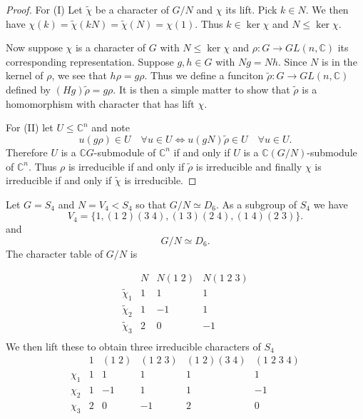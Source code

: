 \documentclass[11pt, notitlepage]{article}
\numberwithin{equation}{section}
\theoremstyle{plain}
\theoremstyle{definition}
\newenvironment{example}
	{\pushQED{\qed}\renewcommand{\qedsymbol}{$\blacktriangleleft$}\examplex}
	{\popQED\endexamplex}
\begin{document}
\begin{proof}
	For (I) Let $\tilde\chi$ be a character of $G/N$ and $\chi$ its lift. Pick $k\in N$. We then have $\chi(k) = \tilde\chi(kN) = \tilde\chi(N) = \chi(1)$. Thus $k\in\ker\chi$ and $N\leq\ker\chi$.

	Now suppose $\chi$ is a character of $G$ with $N\leq\ker\chi$ and $\rho:G\to GL(n,\mathbb{C})$ its corresponding representation. Suppose $g,h\in G$ with $Ng = Nh$. Since $N$ is in the kernel of $\rho$, we see that $h\rho = g\rho$. Thus we define a funciton $\tilde\rho: G\to GL(n,\mathbb{C})$ defined by $(Hg)\tilde\rho = g\rho$. It is then a simple matter to show that $\tilde\rho$ is a homomorphism with character that has lift $\chi$.

	For (II) let $U\leq \mathbb{C}^n$ and note
\[
	u(g\rho)\in U \quad \forall u\in U \iff u(gN)\tilde\rho \in U \quad \forall u\in U.
\]
	Therefore $U$ is a $\mathbb{C}G$-submodule of $\mathbb{C}^n$ if and only if $U$ is a $\mathbb{C}(G/N)$-submodule of $\mathbb{C}^n$. Thus $\rho$ is irreducible if and only if $\tilde\rho$ is irreducible and finally $\chi$ is irreducible if and only if $\tilde\chi$ is irreducible.
\end{proof}

\begin{example}
Let $G=S_4$ and $N = V_4 < S_4$ so that $G/N \simeq D_6$. As a subgroup of $S_4$ we have
\[
	V_4 = \{1, (1\;2)(3\;4), (1\;3)(2\;4), (1\;4)(2\;3)\}.
\]
and 
\[
	G/N \simeq D_6.
\]
The character table of $G/N$ is 
	
\[
    \begin{array}{c|ccc}
                   & N  & N(1\;2)    & N(1\;2\;3)  \\\hline
        \tilde\chi_1     & 1  &      1     &    1\\
        \tilde\chi_2     & 1  &     -1     &    1\\
        \tilde\chi_3     & 2  &      0     &   -1\\
    \end{array}
\]
We then lift these to obtain three irreducible characters of $S_4$
\[
    \begin{array}{c|ccccc}
	    	   & 1  &  (1\;2)    &  (1\;2\;3)  &  (1\;2)(3\;4)  &  (1\;2\;3\;4) \\\hline
	\chi_1     & 1  &      1     &    1        &        1       &        1      \\
	\chi_2     & 1  &     -1     &    1        &        1       &       -1      \\
	\chi_3     & 2  &      0     &   -1        &        2       &        0      \\
    \end{array}
\]

\end{example}
\end{document}
